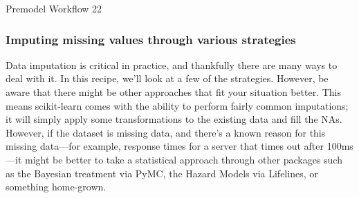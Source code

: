 \documentclass[SKL-MASTER.tex]{subfiles}
\begin{document}
	\LARGE
Premodel Workflow
22
\subsubsection{Imputing missing values through various strategies}
Data imputation is critical in practice, and thankfully there are many ways to deal with it.
In this recipe, we'll look at a few of the strategies. However, be aware that there might be
other approaches that fit your situation better.
This means scikit-learn comes with the ability to perform fairly common imputations; it will
simply apply some transformations to the existing data and fill the NAs. However, if the dataset
is missing data, and there's a known reason for this missing data—for example, response times
for a server that times out after 100ms—it might be better to take a statistical approach through
other packages such as the Bayesian treatment via PyMC, the Hazard Models via Lifelines, or
something home-grown.
\end{document}
